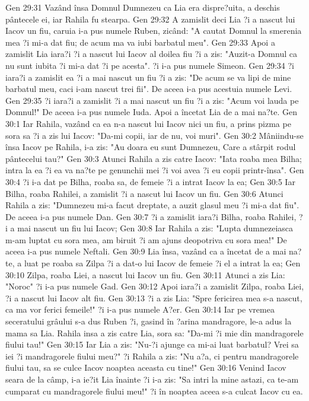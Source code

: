 Gen 29:31  Vazând însa Domnul Dumnezeu ca Lia era dispre?uita, a deschis pântecele ei, iar Rahila fu stearpa.
Gen 29:32  A zamislit deci Lia ?i a nascut lui Iacov un fiu, caruia i-a pus numele Ruben, zicând: "A cautat Domnul la smerenia mea ?i mi-a dat fiu; de acum ma va iubi barbatul meu".
Gen 29:33  Apoi a zamislit Lia iara?i ?i a nascut lui Iacov al doilea fiu ?i a zis: "Auzit-a Domnul ca nu sunt iubita ?i mi-a dat ?i pe acesta". ?i i-a pus numele Simeon.
Gen 29:34  ?i iara?i a zamislit ea ?i a mai nascut un fiu ?i a zis: "De acum se va lipi de mine barbatul meu, caci i-am nascut trei fii". De aceea i-a pus acestuia numele Levi.
Gen 29:35  ?i iara?i a zamislit ?i a mai nascut un fiu ?i a zis: "Acum voi lauda pe Domnul!" De aceea i-a pus numele Iuda. Apoi a încetat Lia de a mai na?te.
Gen 30:1  Iar Rahila, vazând ca ea n-a nascut lui Iacov nici un fiu, a prins pizma pe sora sa ?i a zis lui Iacov: "Da-mi copii, iar de nu, voi muri".
Gen 30:2  Mâniindu-se însa Iacov pe Rahila, i-a zis: "Au doara eu sunt Dumnezeu, Care a stârpit rodul pântecelui tau?"
Gen 30:3  Atunci Rahila a zis catre Iacov: "Iata roaba mea Bilha; intra la ea ?i ea va na?te pe genunchii mei ?i voi avea ?i eu copii printr-însa".
Gen 30:4  ?i i-a dat pe Bilha, roaba sa, de femeie ?i a intrat Iacov la ea;
Gen 30:5  Iar Bilha, roaba Rahilei, a zamislit ?i a nascut lui Iacov un fiu.
Gen 30:6  Atunci Rahila a zis: "Dumnezeu mi-a facut dreptate, a auzit glasul meu ?i mi-a dat fiu". De aceea i-a pus numele Dan.
Gen 30:7  ?i a zamislit iara?i Bilha, roaba Rahilei, ?i a mai nascut un fiu lui Iacov;
Gen 30:8  Iar Rahila a zis: "Lupta dumnezeiasca m-am luptat cu sora mea, am biruit ?i am ajuns deopotriva cu sora mea!" De aceea i-a pus numele Neftali.
Gen 30:9  Lia însa, vazând ca a încetat de a mai na?te, a luat pe roaba sa Zilpa ?i a dat-o lui Iacov de femeie ?i el a intrat la ea;
Gen 30:10  Zilpa, roaba Liei, a nascut lui Iacov un fiu.
Gen 30:11  Atunci a zis Lia: "Noroc" ?i i-a pus numele Gad.
Gen 30:12  Apoi iara?i a zamislit Zilpa, roaba Liei, ?i a nascut lui Iacov alt fiu.
Gen 30:13  ?i a zis Lia: "Spre fericirea mea s-a nascut, ca ma vor ferici femeile!" ?i i-a pus numele A?er.
Gen 30:14  Iar pe vremea seceratului grâului s-a dus Ruben ?i, gasind în ?arina mandragore, le-a adus la mama sa Lia. Rahila insa a zis catre Lia, sora sa: "Da-mi ?i mie din mandragorele fiului tau!"
Gen 30:15  Iar Lia a zis: "Nu-?i ajunge ca mi-ai luat barbatul? Vrei sa iei ?i mandragorele fiului meu?" ?i Rahila a zis: "Nu a?a, ci pentru mandragorele fiului tau, sa se culce Iacov noaptea aceasta cu tine!"
Gen 30:16  Venind Iacov seara de la câmp, i-a ie?it Lia înainte ?i i-a zis: "Sa intri la mine astazi, ca te-am cumparat cu mandragorele fiului meu!" ?i în noaptea aceea s-a culcat Iacov cu ea.
